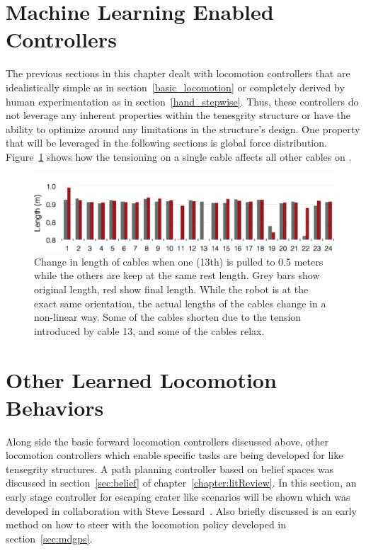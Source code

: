 \section{Machine Learning Enabled Controllers}
The previous sections in this chapter dealt with locomotion controllers that are idealistically simple as in section~\ref{basic_locomotion} or completely derived by human experimentation as in section~\ref{hand_stepwise}.
Thus, these controllers do not leverage any inherent properties within the tenesgrity structure or have the ability to optimize around any limitations in the structure's design.
One property that will be leveraged in the following sections is global force distribution.
Figure~\ref{fig:nonlinear} shows how the tensioning on a single cable affects all other cables on \SB{}.

\begin{figure}[thpb]
\centering
\includegraphics[width=\columnwidth]{tex/ASME-journal/results/actuate1/actuate1.eps}
\caption{ Change in length of cables when one (13th) is pulled to 0.5 meters while the others are keep at the same rest length.  Grey bars show original length, red show final length. While the robot is at the exact same orientation, the actual lengths of the cables change in a non-linear way.  Some of the cables shorten due to the tension introduced by cable 13, and some of the cables relax.}
\label{fig:nonlinear}
\end{figure}

\section{Other Learned Locomotion Behaviors}
\label{sec:otherControllers}
Along side the basic forward locomotion controllers discussed above, other locomotion controllers which enable specific tasks are being developed for \SB{} like tensegrity structures.
A path planning controller based on belief spaces was discussed in section~\ref{sec:belief} of chapter~\ref{chapter:litReview}.
In this section, an early stage controller for escaping crater like scenarios will be shown which was developed in collaboration with Steve Lessard~\cite{lessard2015robust}.
Also briefly discussed is an early method on how to steer with the locomotion policy developed in section~\ref{sec:mdgps}.

